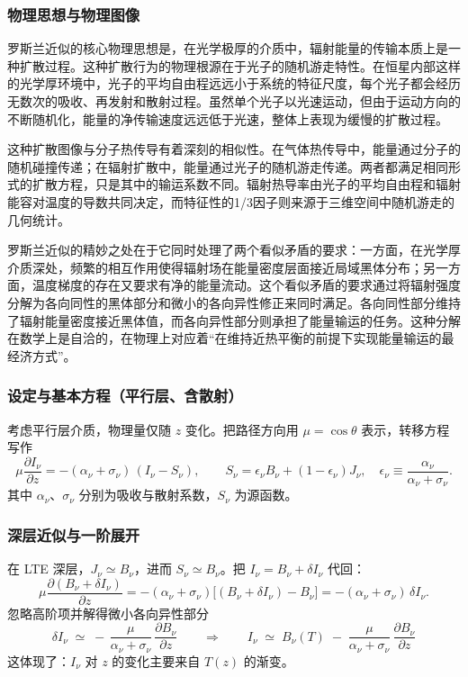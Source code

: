 \subsubsection*{物理思想与物理图像}

罗斯兰近似的核心物理思想是，在光学极厚的介质中，辐射能量的传输本质上是一种扩散过程。这种扩散行为的物理根源在于光子的随机游走特性。在恒星内部这样的光学厚环境中，光子的平均自由程远远小于系统的特征尺度，每个光子都会经历无数次的吸收、再发射和散射过程。虽然单个光子以光速运动，但由于运动方向的不断随机化，能量的净传输速度远远低于光速，整体上表现为缓慢的扩散过程。

这种扩散图像与分子热传导有着深刻的相似性。在气体热传导中，能量通过分子的随机碰撞传递；在辐射扩散中，能量通过光子的随机游走传递。两者都满足相同形式的扩散方程，只是其中的输运系数不同。辐射热导率由光子的平均自由程和辐射能容对温度的导数共同决定，而特征性的1/3因子则来源于三维空间中随机游走的几何统计。

罗斯兰近似的精妙之处在于它同时处理了两个看似矛盾的要求：一方面，在光学厚介质深处，频繁的相互作用使得辐射场在能量密度层面接近局域黑体分布；另一方面，温度梯度的存在又要求有净的能量流动。这个看似矛盾的要求通过将辐射强度分解为各向同性的黑体部分和微小的各向异性修正来同时满足。各向同性部分维持了辐射能量密度接近黑体值，而各向异性部分则承担了能量输运的任务。这种分解在数学上是自洽的，在物理上对应着“在维持近热平衡的前提下实现能量输运的最经济方式”。

\subsubsection*{设定与基本方程（平行层、含散射）}

考虑平行层介质，物理量仅随 $z$ 变化。把路径方向用
$\mu=\cos\theta$ 表示，转移方程写作
\[
\mu \frac{\partial I_\nu}{\partial z}
= -(\alpha_\nu+\sigma_\nu)\, (I_\nu - S_\nu),
\qquad
S_\nu = \epsilon_\nu B_\nu + (1-\epsilon_\nu)J_\nu,
\quad \epsilon_\nu\equiv\frac{\alpha_\nu}{\alpha_\nu+\sigma_\nu}.
\]
其中 $\alpha_\nu$、$\sigma_\nu$ 分别为吸收与散射系数，$S_\nu$ 为源函数。

\subsubsection*{深层近似与一阶展开}


在 LTE 深层，$J_\nu\simeq B_\nu$，进而 $S_\nu\simeq B_\nu$。把 $I_\nu=B_\nu+\delta I_\nu$ 代回：
\[
\mu \frac{\partial (B_\nu+\delta I_\nu)}{\partial z}
= -(\alpha_\nu+\sigma_\nu)\big[(B_\nu+\delta I_\nu)-B_\nu \big]
= -(\alpha_\nu+\sigma_\nu)\,\delta I_\nu .
\]
忽略高阶项并解得微小各向异性部分
\[
\boxed{
\delta I_\nu \;\simeq\; -\,\frac{\mu}{\alpha_\nu+\sigma_\nu}\,\frac{\partial B_\nu}{\partial z}
}
\qquad\Rightarrow\qquad
\boxed{
I_\nu \;\simeq\; B_\nu(T) \;-\; \frac{\mu}{\alpha_\nu+\sigma_\nu}\,\frac{\partial B_\nu}{\partial z}
}
\]
这体现了：$I_\nu$ 对 $z$ 的变化主要来自 $T(z)$ 的渐变。

